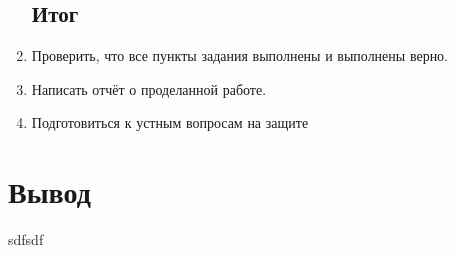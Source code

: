 \begin{enumerate}
            \lstset{language=Python}
            \lstset{language=Python}
            
            \subsection{Итог}
      \item  Проверить, что все пункты задания выполнены и выполнены верно.
      \item  Написать отчёт о проделанной работе.
      \item  Подготовиться к устным вопросам на защите
\end{enumerate}

\section{Вывод}
sdfsdf


